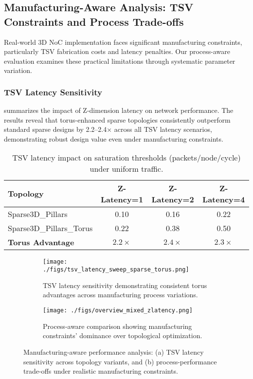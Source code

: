 \documentclass[11pt]{article}
\begin{document}
\subsection{Manufacturing-Aware Analysis: TSV Constraints and Process Trade-offs}

Real-world 3D NoC implementation faces significant manufacturing constraints, particularly TSV fabrication costs and latency penalties. Our process-aware evaluation examines these practical limitations through systematic parameter variation.

\subsubsection{TSV Latency Sensitivity}

 summarizes the impact of Z-dimension latency on network performance. The results reveal that torus-enhanced sparse topologies consistently outperform standard sparse designs by 2.2--2.4× across all TSV latency scenarios, demonstrating robust design value even under manufacturing constraints.

\begin{table}[htbp]
\centering
\caption{TSV latency impact on saturation thresholds (packets/node/cycle) under uniform traffic.}
\label{tab:tsv-latency-impact}
\begin{tabular}{lccc}
\toprule
\textbf{Topology} & \textbf{Z-Latency=1} & \textbf{Z-Latency=2} & \textbf{Z-Latency=4} \\
\midrule
Sparse3D\_Pillars & 0.10 & 0.16 & 0.22 \\
Sparse3D\_Pillars\_Torus & 0.22 & 0.38 & 0.50 \\
\midrule
\textbf{Torus Advantage} & $2.2\times$ & $2.4\times$ & $2.3\times$ \\
\bottomrule
\end{tabular}
\end{table}

\begin{figure}[htbp]
  \centering
  \begin{subfigure}[t]{0.48\linewidth}
    \centering
    \texttt{[image: ./figs/tsv\_latency\_sweep\_sparse\_torus.png]}
    \caption{TSV latency sensitivity demonstrating consistent torus advantages across manufacturing process variations.}
    \label{fig:z-latency-sweep}
  \end{subfigure}\hfill
  \begin{subfigure}[t]{0.48\linewidth}
    \centering
    \texttt{[image: ./figs/overview\_mixed\_zlatency.png]}
    \caption{Process-aware comparison showing manufacturing constraints' dominance over topological optimization.}
    \label{fig:process-aware-overview}
  \end{subfigure}
  \caption{Manufacturing-aware performance analysis: (a) TSV latency sensitivity across topology variants, and (b) process-performance trade-offs under realistic manufacturing constraints.}
  \label{fig:manufacturing-analysis}
\end{figure}
\end{document}

